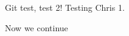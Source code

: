 \documentclass[a4paper,fleqn,usenatbib]{mnras}
\begin{document}
Git test, test 2! Testing Chris 1.

Now we continue



\end{document}

